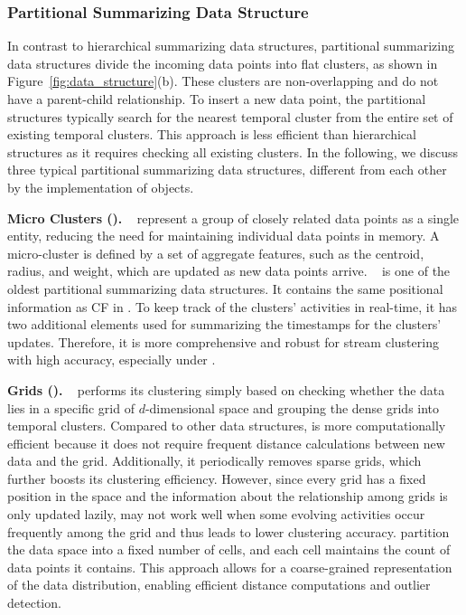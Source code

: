 \subsubsection{Partitional Summarizing Data Structure}
\label{subsec:partition}
In contrast to hierarchical summarizing data structures, partitional summarizing data structures divide the incoming data points into flat clusters, as shown in Figure~\ref{fig:data_structure}(b). These clusters are non-overlapping and do not have a parent-child relationship. To insert a new data point, the partitional structures typically search for the nearest temporal cluster from the entire set of existing temporal clusters. This approach is less efficient than hierarchical structures as it requires checking all existing clusters. In the following, we discuss three typical partitional summarizing data structures, different from each other by the implementation of objects.
 
\textbf{Micro Clusters (\MCs).} 
\label{subsec:MCs}
\MCs~\cite{Clustream:03} represent a group of closely related data points as a single entity, reducing the need for maintaining individual data points in memory. A micro-cluster is defined by a set of aggregate features, such as the centroid, radius, and weight, which are updated as new data points arrive. \MCs~\cite{Clustream:03} is one of the oldest partitional summarizing data structures. It contains the same positional information as CF in \CFT. To keep track of the clusters' activities in real-time, it has two additional elements used for summarizing the timestamps for the clusters' updates. Therefore, it is more comprehensive and robust for stream clustering with high accuracy, especially under \cef.

\textbf{Grids (\Grids).}
\label{subsec:Grids}
\Grids~\cite{DStream:2007} performs its clustering simply based on checking whether the data lies in a specific grid of $d$-dimensional space and grouping the dense grids into temporal clusters. Compared to other data structures, \Grids is more computationally efficient because it does not require frequent distance calculations between new data and the grid. Additionally, it periodically removes sparse grids, which further boosts its clustering efficiency. However, since every grid has a fixed position in the space and the information about the relationship among grids is only updated lazily, \Grids may not work well when some evolving activities occur frequently among the grid and thus leads to lower clustering accuracy. \Grids partition the data space into a fixed number of cells, and each cell maintains the count of data points it contains. This approach allows for a coarse-grained representation of the data distribution, enabling efficient distance computations and outlier detection.

